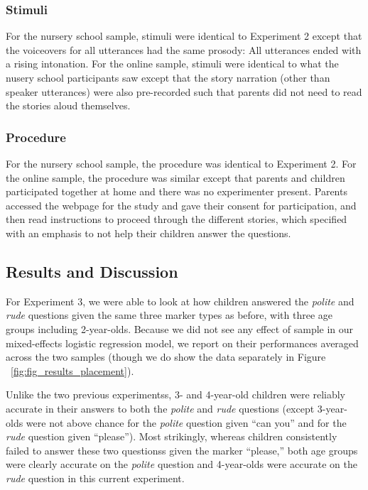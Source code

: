 \documentclass[10pt, letterpaper]{article}
\begin{document}
\subsubsection{Stimuli}\label{stimuli}

For the nursery school sample, stimuli were identical to Experiment 2
except that the voiceovers for all utterances had the same prosody: All
utterances ended with a rising intonation. For the online sample,
stimuli were identical to what the nusery school participants saw except
that the story narration (other than speaker utterances) were also
pre-recorded such that parents did not need to read the stories aloud
themselves.

\subsubsection{Procedure}\label{procedure-2}

For the nursery school sample, the procedure was identical to Experiment
2. For the online sample, the procedure was similar except that parents
and children participated together at home and there was no experimenter
present. Parents accessed the webpage for the study and gave their
consent for participation, and then read instructions to proceed through
the different stories, which specified with an emphasis to not help
their children answer the questions.

\subsection{Results and Discussion}\label{results-and-discussion-2}

For Experiment 3, we were able to look at how children answered the
\emph{polite} and \emph{rude} questions given the same three marker
types as before, with three age groups including 2-year-olds. Because we
did not see any effect of sample in our mixed-effects logistic
regression model, we report on their performances averaged across the
two samples (though we do show the data separately in Figure
~\ref{fig:fig_results_placement}).

Unlike the two previous experimentss, 3- and 4-year-old children were
reliably accurate in their answers to both the \emph{polite} and
\emph{rude} questions (except 3-year-olds were not above chance for the
\emph{polite} question given ``can you'' and for the \emph{rude}
question given ``please''). Most strikingly, whereas children
consistently failed to answer these two questionss given the marker
``please,'' both age groups were clearly accurate on the \emph{polite}
question and 4-year-olds were accurate on the \emph{rude} question in
this current experiment.
\end{document}
